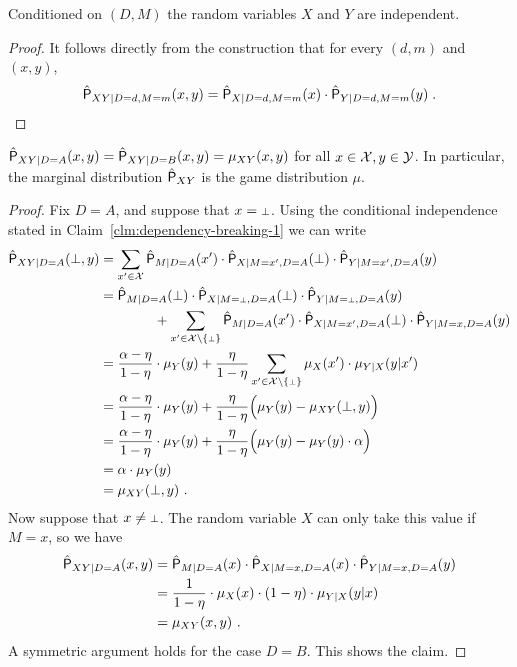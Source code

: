 \begin{claim}
\label{clm:dependency-breaking-1}
	Conditioned on $(D,M)$ the random variables $X$ and $Y$ are independent. 
\end{claim}
\begin{proof}
It follows directly from the construction that for every $(d,m)$ and $(x,y)$, 
\[
		\hat{\P}_{XY | D=d,M=m}(x,y) = \hat{\P}_{X | D=d,M=m}(x) \cdot \hat{\P}_{Y | D=d,M=m}(y)\;.\]
\end{proof}


\begin{claim}
\label{clm:dependency-breaking-2}
 $\hat{\P}_{XY|D = A}(x,y) = \hat{\P}_{XY|D=B}(x,y) = \mu_{XY}(x,y)$ for all $x \in \X,y \in \Y$. In particular, the marginal distribution $\hat{\P}_{XY}$ is the game distribution $\mu$. 
\end{claim}

\begin{proof}
	Fix $D = A$, and suppose that $x = \dummy$. Using the conditional independence stated in Claim~\ref{clm:dependency-breaking-1} we can write 
	\begin{align*}
		\hat{\P}_{XY | D = A}(\dummy,y) &= \sum_{x' \in \X} \hat{\P}_{M | D = A}(x') \cdot \hat{\P}_{X | M=x',D=A}(\dummy) \cdot  \hat{\P}_{Y | M = x', D = A}(y)  \\
		&= \hat{\P}_{M | D = A}(\dummy) \cdot \hat{\P}_{X | M = \dummy, D = A}(\dummy) \cdot  \hat{\P}_{Y | M = \dummy, D = A}(y) \\
		& \qquad \qquad + \sum_{x' \in \X \setminus \{\dummy\}} \hat{\P}_{M | D = A}(x') \cdot \hat{\P}_{X | M = x', D = A}(\dummy) \cdot  \hat{\P}_{Y | M = x, D = A}(y) \\
		&= \frac{\alpha - \eta}{1 - \eta} \cdot \mu_Y(y) + \frac{\eta}{1 - \eta} \sum_{x' \in \X \setminus \{\dummy\}} \mu_X(x') \cdot \mu_{Y|X}(y|x') \\
		&= \frac{\alpha - \eta}{1 - \eta} \cdot \mu_Y(y) + \frac{\eta}{1 - \eta} \Big ( \mu_Y(y) - \mu_{XY}(\dummy,y) \Big ) \\
		&= \frac{\alpha - \eta}{1 - \eta} \cdot \mu_Y(y) + \frac{\eta}{1 - \eta} \Big ( \mu_Y(y) - \mu_{Y}(y) \cdot \alpha \Big ) \\
		&= \alpha \cdot \mu_Y(y) \\
		&= \mu_{XY}(\dummy,y)~.
	\end{align*}
	Now suppose that $x \neq \dummy$. The random variable $X$ can only take this value if $M = x$, so we have
	\begin{align*}
		\hat{\P}_{XY | D = A}(x,y) &= \hat{\P}_{M | D = A}(x) \cdot \hat{\P}_{X | M = x, D = A}(x) \cdot  \hat{\P}_{Y | M=x, D=A}(y) \\
		&= \frac{1}{1 - \eta} \cdot \mu_X(x) \cdot (1 - \eta) \cdot \mu_{Y|X}(y | x) \\
		&= \mu_{XY}(x,y)~.
	\end{align*}
	A symmetric argument holds for the case $D = B$. This shows the claim.
\end{proof}



